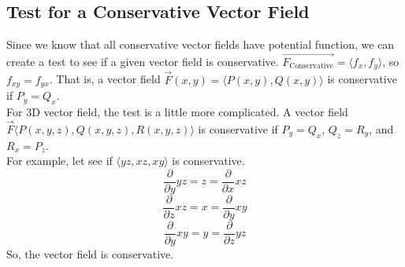 \subsection{Test for a Conservative Vector Field}
\noindent
Since we know that all conservative vector fields have potential function, we can create a test to see if a given vector field is conservative. $\vec{F_{\text{Conservative}}} = \langle f_x, f_y \rangle$, so $f_{xy} = f_{yx}$. That is, a vector field $\vec{F}(x,y) = \langle P(x,y), Q(x,y) \rangle$ is conservative if $P_y = Q_x$.\\
For 3D vector field, the test is a little more complicated. A vector field $\vec{F}\langle P(x,y,z), Q(x,y,z), R(x,y,z)\rangle$ is conservative if $P_y = Q_x$, $Q_z = R_y$, and $R_x = P_z$.\\

\noindent
For example, let see if $\langle yz, xz, xy\rangle$ is conservative.
\begin{equation*}
	\frac{\partial}{\partial y}yz = z = \frac{\partial}{\partial x}xz
\end{equation*}
\begin{equation*}
	\frac{\partial}{\partial z}xz = x = \frac{\partial}{\partial y}xy
\end{equation*}
\begin{equation*}
	\frac{\partial}{\partial y}xy = y = \frac{\partial}{\partial z}yz
\end{equation*}
So, the vector field is conservative.
